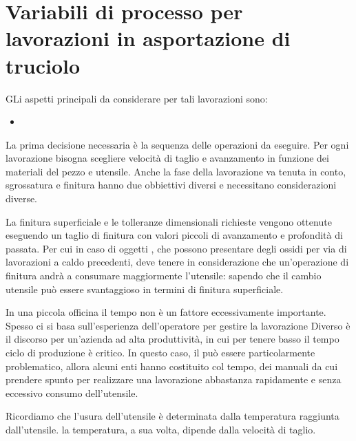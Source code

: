 \chapter{Variabili di processo per lavorazioni in asportazione di truciolo}
\label{chp:VarProcAsportazione}
GLi aspetti principali da considerare per tali lavorazioni sono:
\begin{itemize}
\item {}
\end{itemize}

La prima decisione necessaria è la sequenza delle operazioni da eseguire.
Per ogni lavorazione bisogna scegliere velocità di taglio e avanzamento in funzione dei materiali del pezzo e utensile. Anche la fase della lavorazione 
va tenuta in conto, sgrossatura e finitura hanno due obbiettivi diversi 
e necessitano considerazioni diverse.

La finitura superficiale e le tolleranze dimensionali richieste vengono ottenute eseguendo un taglio di finitura con valori piccoli di avanzamento e profondità di passata.
Per cui in caso di oggetti , che possono presentare degli ossidi per via di lavorazioni a caldo precedenti, deve tenere in considerazione che un'operazione di finitura andrà a consumare maggiormente l'utensile: sapendo che il cambio utensile può essere svantaggioso in termini di finitura superficiale.

In una piccola officina il tempo non è un fattore eccessivamente importante.
Spesso ci si basa sull'esperienza dell'operatore per gestire la lavorazione
Diverso è il discorso per un'azienda ad alta produttività, in cui per tenere
basso il tempo ciclo di produzione è critico.
In questo caso, il  può essere particolarmente problematico, 
allora alcuni enti hanno costituito col tempo, dei manuali da cui prendere
spunto per realizzare una lavorazione abbastanza rapidamente e senza eccessivo consumo dell'utensile. 

Ricordiamo che l'usura dell'utensile è determinata dalla temperatura raggiunta dall'utensile.
la temperatura, a sua volta, dipende dalla velocità di taglio.


